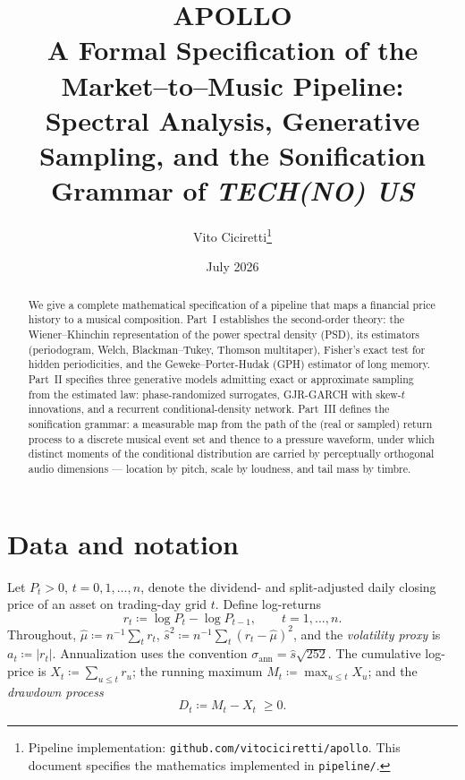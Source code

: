 \documentclass[11pt,a4paper]{article}
\title{\textbf{APOLLO}\\[2pt]\large A Formal Specification of the Market--to--Music Pipeline:\\
Spectral Analysis, Generative Sampling, and the Sonification Grammar of \emph{TECH(NO) US}}
\author{Vito Ciciretti\thanks{Pipeline implementation: \texttt{github.com/vitociciretti/apollo}. This document specifies the mathematics implemented in \texttt{pipeline/}.}}
\date{July 2026}
\begin{document}
\maketitle

\begin{abstract}
We give a complete mathematical specification of a pipeline that maps a financial
price history to a musical composition. Part~I establishes the second-order theory:
the Wiener--Khinchin representation of the power spectral density (PSD), its
estimators (periodogram, Welch, Blackman--Tukey, Thomson multitaper), Fisher's exact
test for hidden periodicities, and the Geweke--Porter-Hudak (GPH) estimator of long
memory. Part~II specifies three generative models admitting exact or approximate
sampling from the estimated law: phase-randomized surrogates, GJR-GARCH with
skew-$t$ innovations, and a recurrent conditional-density network. Part~III defines
the sonification grammar: a measurable map from the path of the (real or sampled)
return process to a discrete musical event set and thence to a pressure waveform,
under which distinct moments of the conditional distribution are carried by
perceptually orthogonal audio dimensions --- location by pitch, scale by loudness,
and tail mass by timbre.
\end{abstract}

\tableofcontents

\section{Data and notation}

Let $P_t>0$, $t=0,1,\dots,n$, denote the dividend- and split-adjusted daily closing
price of an asset on trading-day grid $t$. Define log-returns
\begin{equation}
r_t \coloneqq \log P_t - \log P_{t-1}, \qquad t=1,\dots,n .
\end{equation}
Throughout, $\hat\mu \coloneqq n^{-1}\sum_t r_t$, $\hat s^2 \coloneqq
n^{-1}\sum_t (r_t-\hat\mu)^2$, and the \emph{volatility proxy} is $a_t \coloneqq
|r_t|$. Annualization uses the convention $\sigma_{\mathrm{ann}} = \hat s\sqrt{252}$.
The cumulative log-price is $X_t \coloneqq \sum_{u\le t} r_u$; the running maximum
$M_t \coloneqq \max_{u\le t} X_u$; and the \emph{drawdown process}
\begin{equation}
D_t \coloneqq M_t - X_t \;\ge 0 .
\label{eq:drawdown}
\end{equation}
\end{document}

